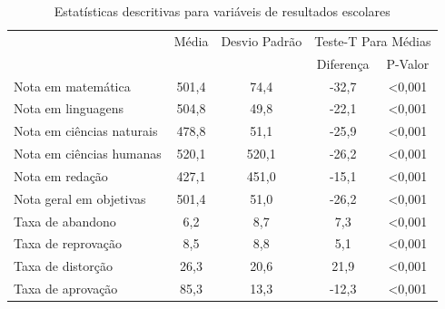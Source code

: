 \begin{table}[H]
\centering
\caption{Estatísticas descritivas para variáveis de resultados escolares}
\label{tab:descritiva_resultados}
\begin{tabular}{lcccc}
\hline
                          &Média& Desvio Padrão & \multicolumn{2}{c}{Teste-T Para Médias}\\
\cline{4-5}
                          & & & Diferença & P-Valor \\
\hline
Nota em matemática        & 501,4 &74,4 &-32,7& <0,001\\
Nota em linguagens        & 504,8& 49,8&-22,1& <0,001\\
Nota em ciências naturais & 478,8&51,1 &-25,9& <0,001\\
Nota em ciências humanas  & 520,1& 520,1 &-26,2& <0,001\\
Nota em redação           & 427,1& 451,0&-15,1& <0,001\\
Nota geral em objetivas          & 501,4& 51,0&-26,2& <0,001\\
Taxa de abandono          & 6,2&8,7&7,3& <0,001\\
Taxa de reprovação        & 8,5&8,8&5,1& <0,001\\
Taxa de distorção         & 26,3&20,6&21,9& <0,001\\
Taxa de aprovação         & 85,3&13,3&-12,3& <0,001\\ 
\hline
\end{tabular}
\end{table}

